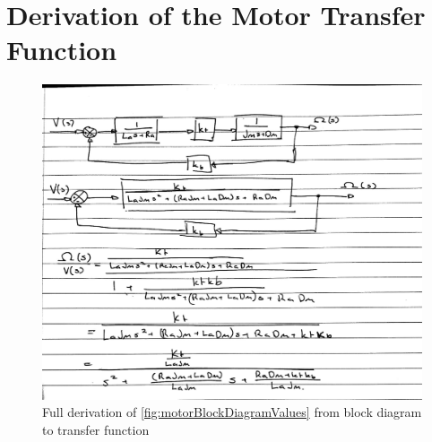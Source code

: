 \documentclass[a4paper, 12pt, compsoc]{IEEEtran}
\begin{document}
        \section{Derivation of the Motor Transfer Function}\label{app:motorDerivation}
            \begin{figure}[!h]
                \centering
                \includegraphics[width=\columnwidth]{lab2Derivation.jpg}
                \caption{Full derivation of \cref{fig:motorBlockDiagramValues} from block diagram to transfer function}
                \label{fig:motorDerivation}
            \end{figure}
\end{document}

